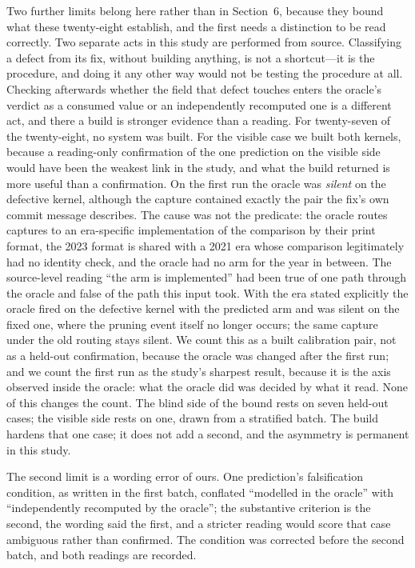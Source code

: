 Two further limits belong here rather than in Section~6, because they bound what
these twenty-eight establish, and the first needs a distinction to be read
correctly. Two separate acts in this study are performed from source. Classifying a
defect from its fix, without building anything, is not a shortcut---it is the
procedure, and doing it any other way would not be testing the procedure at all.
Checking afterwards whether the field that defect touches enters the oracle's
verdict as a consumed value or an independently recomputed one is a different act,
and there a build is stronger evidence than a reading. For twenty-seven of the
twenty-eight, no system was built. For the visible case we built both kernels,
because a reading-only confirmation of the one prediction on the visible side would
have been the weakest link in the study, and what the build returned is more useful
than a confirmation. On the first run the oracle was \emph{silent} on the defective
kernel, although the capture contained exactly the pair the fix's own commit message
describes. The cause was not the predicate: the oracle routes captures to an
era-specific implementation of the comparison by their print format, the 2023 format
is shared with a 2021 era whose comparison legitimately had no identity check, and
the oracle had no arm for the year in between. The source-level reading ``the arm is
implemented'' had been true of one path through the oracle and false of the path this
input took. With the era stated explicitly the oracle fired on the defective kernel
with the predicted arm and was silent on the fixed one, where the pruning event
itself no longer occurs; the same capture under the old routing stays silent. We
count this as a built calibration pair, not as a held-out confirmation, because the
oracle was changed after the first run; and we count the first run as the study's
sharpest result, because it is the axis observed inside the oracle: what the oracle
did was decided by what it read. None of this changes the count. The blind side of
the bound rests on seven held-out cases; the visible side rests on one, drawn from a
stratified batch. The build hardens that one case; it does not add a second, and the
asymmetry is permanent in this study.

The second limit is a wording error of ours. One prediction's falsification
condition, as written in the first batch, conflated ``modelled in the oracle'' with
``independently recomputed by the oracle''; the substantive criterion is the second,
the wording said the first, and a stricter reading would score that case ambiguous
rather than confirmed. The condition was corrected before the second batch, and both
readings are recorded.

